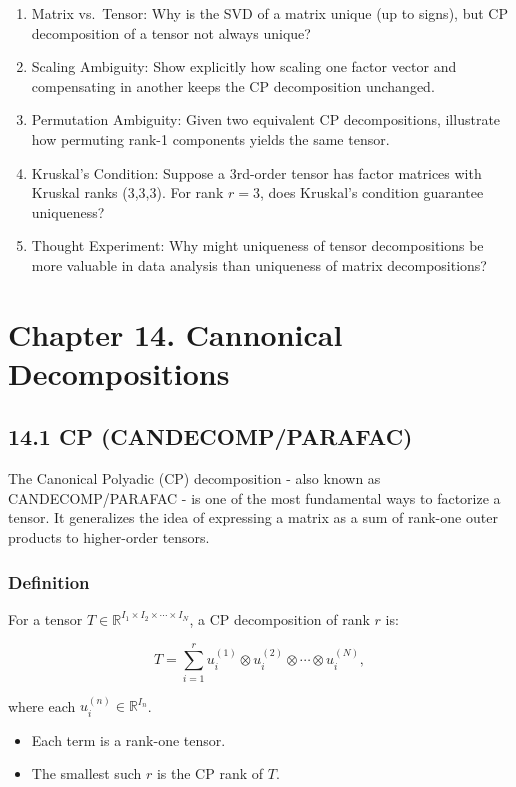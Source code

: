 \documentclass[
  letterpaper,
  DIV=11,
  numbers=noendperiod]{scrreprt}
\providecommand{\tightlist}{%
  \setlength{\itemsep}{0pt}\setlength{\parskip}{0pt}}
\begin{document}
\begin{enumerate}
\def\labelenumi{\arabic{enumi}.}
\item
  Matrix vs.~Tensor: Why is the SVD of a matrix unique (up to signs),
  but CP decomposition of a tensor not always unique?
\item
  Scaling Ambiguity: Show explicitly how scaling one factor vector and
  compensating in another keeps the CP decomposition unchanged.
\item
  Permutation Ambiguity: Given two equivalent CP decompositions,
  illustrate how permuting rank-1 components yields the same tensor.
\item
  Kruskal's Condition: Suppose a 3rd-order tensor has factor matrices
  with Kruskal ranks (3,3,3). For rank \(r=3\), does Kruskal's condition
  guarantee uniqueness?
\item
  Thought Experiment: Why might uniqueness of tensor decompositions be
  more valuable in data analysis than uniqueness of matrix
  decompositions?
\end{enumerate}

\section{Chapter 14. Cannonical
Decompositions}\label{chapter-14.-cannonical-decompositions}

\subsection{14.1 CP (CANDECOMP/PARAFAC)}\label{cp-candecompparafac}

The Canonical Polyadic (CP) decomposition - also known as
CANDECOMP/PARAFAC - is one of the most fundamental ways to factorize a
tensor. It generalizes the idea of expressing a matrix as a sum of
rank-one outer products to higher-order tensors.

\subsubsection{Definition}\label{definition-2}

For a tensor
\(T \in \mathbb{R}^{I_1 \times I_2 \times \cdots \times I_N}\), a CP
decomposition of rank \(r\) is:

\[
T = \sum_{i=1}^r u^{(1)}_i \otimes u^{(2)}_i \otimes \cdots \otimes u^{(N)}_i,
\]

where each \(u^{(n)}_i \in \mathbb{R}^{I_n}\).

\begin{itemize}
\tightlist
\item
  Each term is a rank-one tensor.
\item
  The smallest such \(r\) is the CP rank of \(T\).
\end{itemize}
\end{document}
